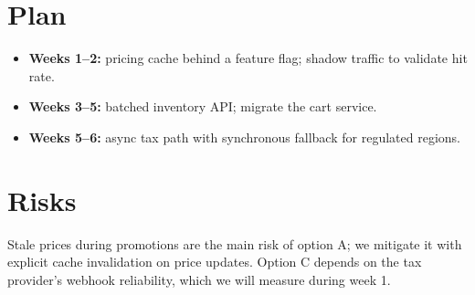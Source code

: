 \documentclass[11pt]{article}
\begin{document}
\section{Plan}
\begin{itemize}
  \item \textbf{Weeks 1--2:} pricing cache behind a feature flag; shadow traffic to validate hit rate.
  \item \textbf{Weeks 3--5:} batched inventory API; migrate the cart service.
  \item \textbf{Weeks 5--6:} async tax path with synchronous fallback for regulated regions.
\end{itemize}

\section{Risks}
Stale prices during promotions are the main risk of option A; we mitigate it with explicit cache invalidation on price updates. Option C depends on the tax provider's webhook reliability, which we will measure during week 1.
\end{document}
